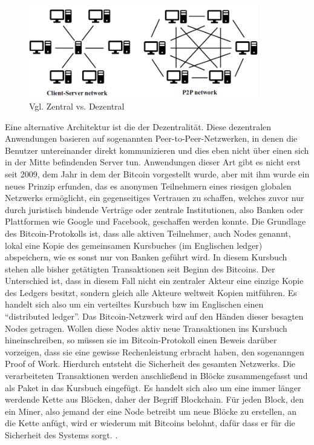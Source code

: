 \begin{figure}[ht!]
	\centering
	\includegraphics[width=100mm]{peer2peer.jpg}
	\caption{Vgl. Zentral vs. Dezentral\cite{p2p} \label{overflow}}
\end{figure} Eine alternative Architektur ist die der Dezentralität. Diese dezentralen Anwendungen basieren auf sogenannten Peer-to-Peer-Netzwerken, in denen die Benutzer untereinander direkt kommunizieren und dies eben nicht über einen sich in der Mitte befindenden Server tun. Anwendungen dieser Art gibt es nicht erst seit 2009, dem Jahr in dem der Bitcoin vorgestellt wurde, aber mit ihm wurde ein neues Prinzip erfunden, das es anonymen Teilnehmern eines riesigen globalen Netzwerks ermöglicht, ein gegenseitiges Vertrauen zu schaffen, welches zuvor nur durch juristisch bindende Verträge oder zentrale Institutionen, also Banken oder Plattformen wie Google und Facebook, geschaffen werden konnte. Die Grundlage des Bitcoin-Protokolls ist, dass alle aktiven Teilnehmer, auch Nodes genannt, lokal eine Kopie des gemeinsamen Kursbuches (im Englischen ledger) abspeichern, wie es sonst nur von Banken geführt wird. In diesem Kursbuch stehen alle bisher getätigten Transaktionen seit Beginn des Bitcoins. Der Unterschied ist, dass in diesem Fall nicht ein zentraler Akteur eine einzige Kopie des Ledgers besitzt, sondern gleich alle Akteure weltweit Kopien mitführen. Es handelt sich also um ein verteiltes Kursbuch bzw im Englischen einen ``distributed ledger''. Das Bitcoin-Netzwerk wird auf den Händen dieser besagten Nodes getragen. Wollen diese Nodes aktiv neue Transaktionen ins Kursbuch hineinschreiben, so müssen sie im Bitcoin-Protokoll einen Beweis darüber vorzeigen, dass sie eine gewisse Rechenleistung erbracht haben, den sogenanngen Proof of Work. Hierdurch entsteht die Sicherheit des gesamten Netzwerks. Die verarbeiteten Transaktionen werden anschließend in Blöcke zusammengefasst und als Paket in das Kursbuch eingefügt. Es handelt sich also um eine immer länger werdende Kette aus Blöcken, daher der Begriff Blockchain. Für jeden Block, den ein Miner, also jemand der eine Node betreibt um neue Blöcke zu erstellen, an die Kette anfügt, wird er wiederum mit Bitcoins belohnt, dafür dass er für die Sicherheit des Systems sorgt. \cite{bitcoinWiki}\cite{tokenEco}. \newline
